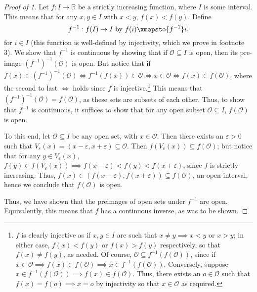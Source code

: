 \begin{proof}[Proof of 1]
	Let \( f : I \to \mathbb{R} \) be a strictly increasing function, where \( I \) is some interval. This means that for any \( x, y \in I \) with \( x < y \), \( f(x) < f(y). \) Define \[f^{-1}  : f(I) \to I  \mbox{ by }  f(i) \xmapsto{f^{-1} } i,\] for \( i \in I\) (this function is well-defined by injectivity, which we prove in footnote 3). We show that \( f^{-1}  \) is continuous by showing that if \( \mathcal{O} \subseteq I \) is open, then its pre-image \( (f^{-1})^{-1}  (\mathcal{O} )  \) is open. But notice that if \( f(x) \in (f^{-1})^{-1} (\mathcal{O} ) \iff f^{-1}(f(x)) \in \mathcal{O}  \iff  x \in \mathcal{O} \iff f(x) \in f(\mathcal{O} ) \), where the second to last \( \iff  \) holds since \( f \)  is injective.\footnote{\( f \) is clearly injective as if \( x, y \in I \) are such that \( x\neq y \implies x < y \) or \( x>y \); in either case, \( f(x) < f(y) \) or \( f(x) > f(y) \) respectively, so that \( f(x) \neq f(y) \), as needed. Of course, \( \mathcal{O } \subseteq f^{-1}(f(\mathcal{O} ))  \), since if \( x \in \mathcal{O} \implies f(x) \in f(\mathcal{O}) \implies  x \in f^{-1}(f(\mathcal{O} ))   \). Conversely, suppose \( x \in f^{-1}(f(\mathcal{O} )) \implies f(x) \in f(\mathcal{O} ). \) Thus, there exists an \( o \in \mathcal{O}  \) such that \( f(x) = f(o) \implies x = o \) by injectivity so that \( x \in \mathcal{O}  \) as required.} This means that \( (f^{-1})^{-1}(\mathcal{O} ) = f(\mathcal{O})   \), as these sets are subsets of each other. Thus, to show that \( f^{-1}  \) is continuous, it suffices to show that for any open subset \( \mathcal{O} \subseteq I \), \( f(\mathcal{O} ) \) is open.

	To this end, let \( \mathcal{O} \subseteq I \) be any open set, with \( x \in \mathcal{O}  \). Then there exists an \( \varepsilon > 0 \) such that \( V_\varepsilon (x) = (x - \varepsilon , x+ \varepsilon ) \subseteq \mathcal{O}  \). Then \( f(V_\varepsilon (x))  \subseteq f(\mathcal{O} ) \); but notice that for any \( y \in V_\varepsilon (x) \), \( f(y) \in f(V_\varepsilon (x)) \implies  f(x - \varepsilon ) < f(y) < f(x+ \varepsilon ) \), since \( f \) is strictly increasing. Thus, \(f(x) \in (f(x-\varepsilon ), f(x+\varepsilon )) \subseteq f(\mathcal{O} )\), an open interval, hence we conclude that \( f(\mathcal{O} ) \) is open.

	Thus, we have shown that the preimages of open sets under \( f^{-1}  \) are open. Equivalently, this means that \( f\) has a continuous inverse, as was to be shown.
\end{proof}
